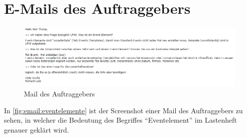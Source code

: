 \chapter{E-Mails des Auftraggebers}
\begin{figure}[ht!]
    \centering
    \includegraphics[width=1.0\textwidth]{Bilder/mail_eventelemente.png}
    \caption{Mail des Auftraggebers}
    \label{fig:email:eventelemente}
\end{figure}
In \autoref{fig:email:eventelemente} ist der Screenshot einer Mail des Auftraggebers zu sehen, in welcher die Bedeutung des Begriffes \enquote{Eventelement} im Lastenheft genauer geklärt wird.